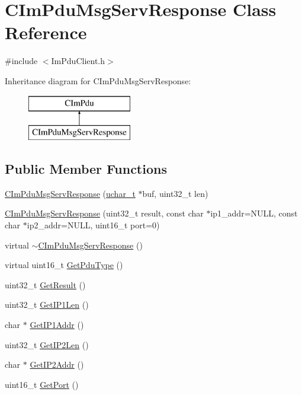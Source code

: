 \hypertarget{class_c_im_pdu_msg_serv_response}{}\section{C\+Im\+Pdu\+Msg\+Serv\+Response Class Reference}
\label{class_c_im_pdu_msg_serv_response}


{\ttfamily \#include $<$Im\+Pdu\+Client.\+h$>$}

Inheritance diagram for C\+Im\+Pdu\+Msg\+Serv\+Response\+:\begin{figure}[H]
\begin{center}
\leavevmode
\includegraphics[height=2.000000cm]{class_c_im_pdu_msg_serv_response}
\end{center}
\end{figure}
\subsection*{Public Member Functions}
\begin{DoxyCompactItemize}
\item 
\hyperlink{class_c_im_pdu_msg_serv_response_a9e7ab39733ae5f9eaadc1ac67cbd80b0}{C\+Im\+Pdu\+Msg\+Serv\+Response} (\hyperlink{base_2ostype_8h_a124ea0f8f4a23a0a286b5582137f0b8d}{uchar\+\_\+t} $\ast$buf, uint32\+\_\+t len)
\item 
\hyperlink{class_c_im_pdu_msg_serv_response_abc4255ad057bcbdbbe27f07fa31e95c5}{C\+Im\+Pdu\+Msg\+Serv\+Response} (uint32\+\_\+t result, const char $\ast$ip1\+\_\+addr=N\+U\+L\+L, const char $\ast$ip2\+\_\+addr=N\+U\+L\+L, uint16\+\_\+t port=0)
\item 
virtual \hyperlink{class_c_im_pdu_msg_serv_response_accb9fc1f76b399c2ecb84b9bae8342f2}{$\sim$\+C\+Im\+Pdu\+Msg\+Serv\+Response} ()
\item 
virtual uint16\+\_\+t \hyperlink{class_c_im_pdu_msg_serv_response_a18690df63b0ebbda0d43b28dbd84023e}{Get\+Pdu\+Type} ()
\item 
uint32\+\_\+t \hyperlink{class_c_im_pdu_msg_serv_response_a13297907fece72e6b2a36d0df5c0bf7c}{Get\+Result} ()
\item 
uint32\+\_\+t \hyperlink{class_c_im_pdu_msg_serv_response_a6354dc62dd1cdf2731912a7304b002e8}{Get\+I\+P1\+Len} ()
\item 
char $\ast$ \hyperlink{class_c_im_pdu_msg_serv_response_a5790e915c940f6b5a7ec388a911a2030}{Get\+I\+P1\+Addr} ()
\item 
uint32\+\_\+t \hyperlink{class_c_im_pdu_msg_serv_response_a7b1d1b740ea8ea19fb5bad817e8eedfa}{Get\+I\+P2\+Len} ()
\item 
char $\ast$ \hyperlink{class_c_im_pdu_msg_serv_response_adc4bd8b8686fece51345302ce81918af}{Get\+I\+P2\+Addr} ()
\item 
uint16\+\_\+t \hyperlink{class_c_im_pdu_msg_serv_response_a15abb1dbd96d0b5b01e8e385428cf190}{Get\+Port} ()
\end{DoxyCompactItemize}
